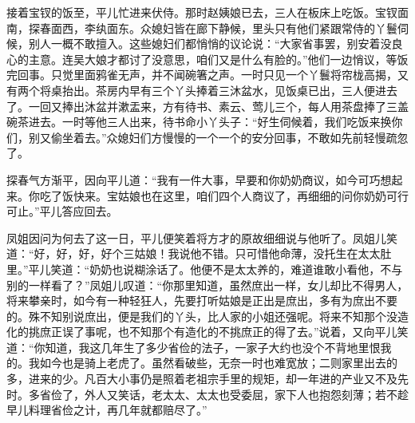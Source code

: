接着宝钗的饭至，平儿忙进来伏侍。那时赵姨娘已去，三人在板床上吃饭。宝钗面南，探春面西，李纨面东。众媳妇皆在廊下静候，里头只有他们紧跟常侍的丫鬟伺候，别人一概不敢擅入。这些媳妇们都悄悄的议论说：``大家省事罢，别安着没良心的主意。连吴大娘才都讨了没意思，咱们又是什么有脸的。''他们一边悄议，等饭完回事。只觉里面鸦雀无声，并不闻碗箸之声。一时只见一个丫鬟将帘栊高揭，又有两个将桌抬出。茶房内早有三个丫头捧着三沐盆水，见饭桌已出，三人便进去了。一回又捧出沐盆并漱盂来，方有待书、素云、莺儿三个，每人用茶盘捧了三盖碗茶进去。一时等他三人出来，待书命小丫头子：``好生伺候着，我们吃饭来换你们，别又偷坐着去。''众媳妇们方慢慢的一个一个的安分回事，不敢如先前轻慢疏忽了。

探春气方渐平，因向平儿道：``我有一件大事，早要和你奶奶商议，如今可巧想起来。你吃了饭快来。宝姑娘也在这里，咱们四个人商议了，再细细的问你奶奶可行可止。''平儿答应回去。

凤姐因问为何去了这一日，平儿便笑着将方才的原故细细说与他听了。凤姐儿笑道：``好，好，好，好个三姑娘！我说他不错。只可惜他命薄，没托生在太太肚里。''平儿笑道：``奶奶也说糊涂话了。他便不是太太养的，难道谁敢小看他，不与别的一样看了？''凤姐儿叹道：``你那里知道，虽然庶出一样，女儿却比不得男人，将来攀亲时，如今有一种轻狂人，先要打听姑娘是正出是庶出，多有为庶出不要的。殊不知别说庶出，便是我们的丫头，比人家的小姐还强呢。将来不知那个没造化的挑庶正误了事呢，也不知那个有造化的不挑庶正的得了去。''说着，又向平儿笑道：``你知道，我这几年生了多少省俭的法子，一家子大约也没个不背地里恨我的。我如今也是骑上老虎了。虽然看破些，无奈一时也难宽放；二则家里出去的多，进来的少。凡百大小事仍是照着老祖宗手里的规矩，却一年进的产业又不及先时。多省俭了，外人又笑话，老太太、太太也受委屈，家下人也抱怨刻薄；若不趁早儿料理省俭之计，再几年就都赔尽了。''

